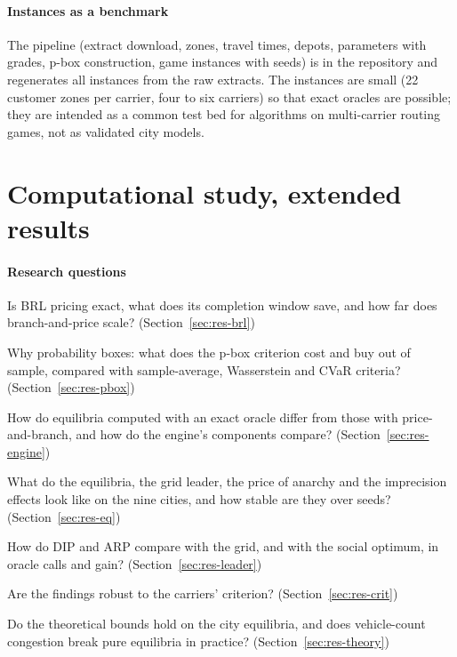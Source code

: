 \documentclass[preprint,11pt]{elsarticle}
\theoremstyle{definition}
\theoremstyle{remark}
\begin{document}
\paragraph{Instances as a benchmark} The pipeline (extract download, zones, travel times, depots, parameters with grades, p-box construction, game instances with seeds) is in the repository and regenerates all instances from the raw extracts. The instances are small (22 customer zones per carrier, four to six carriers) so that exact oracles are possible; they are intended as a common test bed for algorithms on multi-carrier routing games, not as validated city models.


\section{Computational study, extended results}\label{sec:results}

\paragraph{Research questions}
\begin{description}[itemsep=0pt]
\item[RQ1] Is BRL pricing exact, what does its completion window save, and how far does branch-and-price scale? (Section~\ref{sec:res-brl})
\item[RQ2] Why probability boxes: what does the p-box criterion cost and buy out of sample, compared with sample-average, Wasserstein and CVaR criteria? (Section~\ref{sec:res-pbox})
\item[RQ3] How do equilibria computed with an exact oracle differ from those with price-and-branch, and how do the engine's components compare? (Section~\ref{sec:res-engine})
\item[RQ4] What do the equilibria, the grid leader, the price of anarchy and the imprecision effects look like on the nine cities, and how stable are they over seeds? (Section~\ref{sec:res-eq})
\item[RQ5] How do DIP and ARP compare with the grid, and with the social optimum, in oracle calls and gain? (Section~\ref{sec:res-leader})
\item[RQ6] Are the findings robust to the carriers' criterion? (Section~\ref{sec:res-crit})
\item[RQ7] Do the theoretical bounds hold on the city equilibria, and does vehicle-count congestion break pure equilibria in practice? (Section~\ref{sec:res-theory})
\end{description}
\end{document}
